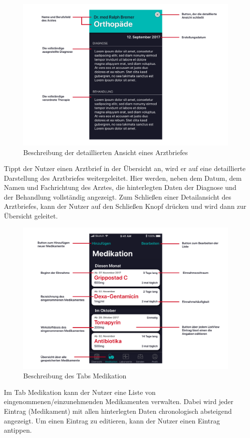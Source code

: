 \documentclass[a4paper]{scrreprt}
\begin{document}
\begin{figure}[H]
\centering
\includegraphics[width=1\textwidth]{graphics/UIDescriptions/DetailedDLDesc}
\caption{Beschreibung der detaillierten Ansicht eines Arztbriefes}
\vspace{0.5cm}
\end{figure}
Tippt der Nutzer einen Arztbrief in der Übersicht an, wird er auf eine detaillierte Darstellung des Arztbriefes weitergeleitet. Hier werden, neben dem Datum, dem Namen und Fachrichtung des Arztes, die hinterlegten Daten der Diagnose und der Behandlung vollständig angezeigt. Zum Schließen einer Detailansicht des Arztbriefes, kann der Nutzer auf den \dq Schließen\dq{} Knopf drücken und wird dann zur Übersicht geleitet.


\begin{figure}[H]
\centering
\includegraphics[width=1\textwidth]{graphics/UIDescriptions/MedicationsDesc}
\caption{Beschreibung des Tabs \dq Medikation\dq{}}
\vspace{0.5cm}
\end{figure}
Im Tab \dq Medikation \dq{} kann der Nutzer eine Liste von eingenommenen/einzunehmenden Medikamenten verwalten. Dabei wird jeder Eintrag (Medikament) mit allen hinterlegten Daten chronologisch absteigend angezeigt. Um einen Eintrag zu editieren, kann der Nutzer einen Eintrag antippen.
\end{document}

